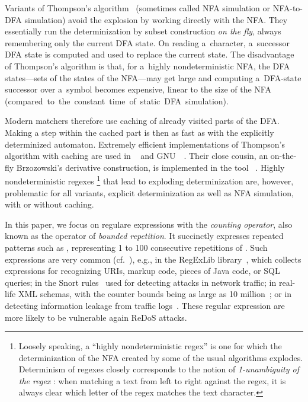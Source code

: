 \documentclass[acmsmall,screen]{acmart}
\begin{document}
Variants of Thompson's algorithm~\cite{thompsonmatching} (sometimes called NFA simulation or NFA-to-DFA simulation)
avoid the explosion by working directly with the NFA. They essentially run the
determinization by subset construction \emph{on the fly}, 
always remembering only the current DFA state.
On reading a~character, a~successor DFA state is computed and used to replace
the current state.
The disadvantage of Thompson's algorithm is that, for a~highly nondeterministic
NFA, the DFA states---sets of the states of the NFA---may get large and computing
a~DFA-state successor over a~symbol becomes expensive, linear to the size of
the NFA \mbox{(compared to the constant time of static DFA simulation).}

Modern matchers therefore use caching of already visited parts of the 
DFA.
Making a step within the cached part is then as fast as with the explicitly determinized automaton.
%
Extremely efficient implementations of Thompson's algorithm with caching are used in
\retwo~\cite{re2} and GNU~\grep~\cite{grep}.
Their close cousin, an on-the-fly Brzozowski's derivative construction, is
implemented in the tool \srm~\cite{VSXW19}.
%
Highly nondeterministic regexes%
\footnote{
Loosely speaking, 
a ``highly nondeterministic regex'' is one for which the determinization of the
NFA created by some of the usual algorithms explodes. Determinism of regexes
closely corresponds to the notion of \emph{1-unambiguity of the regex} \cite{BW98,Hovland09}: when matching a text from left to right against the regex, it is always clear which letter of the regex matches the text character. 
}
 that lead to exploding determinization are, however, problematic for all variants, explicit determinization as well as NFA simulation, with or without caching.
%

In this paper, we focus on regulare expressions with
%
the \emph{counting operator}, also known as the operator of \emph{bounded repetition}. 
%
It succinctly expresses repeated patterns such as ,
representing 1 to 100 consecutive repetitions of .
%
Such expressions are very common (cf.~\cite{cikm15}), e.g., in the RegExLib
library~\cite{regexlib}, which collects expressions for recognizing URIs, markup
code, pieces of Java code, or SQL queries; in the Snort rules~\cite{snort} used
for detecting attacks in network traffic; in real-life XML schemas, with the
counter bounds being as large as 10 million~\cite{cikm15};
%
or in detecting information leakage from traffic
logs~\cite{aplas19}. 
%
These regular expression are more likely to be vulnerable again ReDoS attacks.
\end{document}
